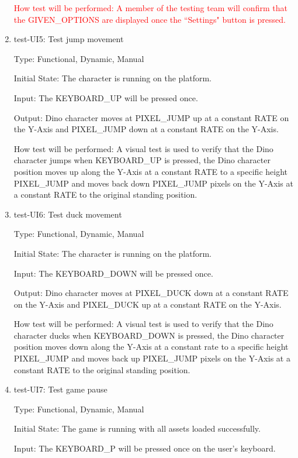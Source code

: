 \documentclass[12pt, titlepage]{article}
\begin{document}
\begin{enumerate}
\textcolor{red}{How test will be performed: A member of the testing team will confirm that the GIVEN\_OPTIONS are displayed once the ``Settings" button is pressed.}

\item{test-UI5: Test jump movement\\}

Type: Functional, Dynamic, Manual
					
Initial State: The character is running on the platform.
					
Input: The KEYBOARD\_UP will be pressed once.
					
Output: Dino character moves at PIXEL\_JUMP up at a constant RATE on the Y-Axis and PIXEL\_JUMP down at a constant RATE on the Y-Axis.
					
How test will be performed: A visual test is used to verify that the Dino character jumps when KEYBOARD\_UP is pressed, the Dino character position moves up along the Y-Axis at a constant RATE to a specific height PIXEL\_JUMP and moves back down PIXEL\_JUMP pixels on the Y-Axis at a constant RATE to the original standing position.
					
\item{test-UI6: Test duck movement\\}

Type: Functional, Dynamic, Manual
					
Initial State: The character is running on the platform.
					
Input: The KEYBOARD\_DOWN will be pressed once.
					
Output: Dino character moves at PIXEL\_DUCK down at a constant RATE on the Y-Axis and PIXEL\_DUCK up at a constant RATE on the Y-Axis.
					
How test will be performed: A visual test is used to verify that the Dino character ducks when KEYBOARD\_DOWN is pressed, the Dino character position moves down along the Y-Axis at a constant rate to a specific height PIXEL\_JUMP and moves back up PIXEL\_JUMP pixels on the Y-Axis at a constant RATE to the original standing position.

\item{test-UI7: Test game pause\\}

Type: Functional, Dynamic, Manual
					
Initial State: The game is running with all assets loaded successfully.
					
Input: The KEYBOARD\_P will be pressed once on the user's keyboard.
					

\end{enumerate}
\end{document}
